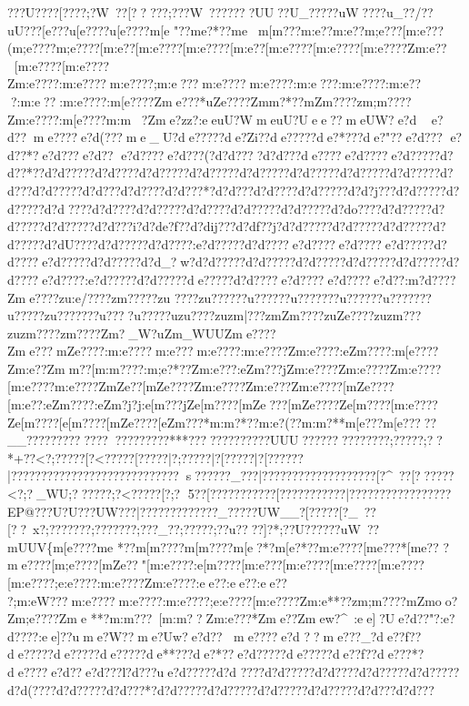 {{{{{{{{{{{{{{{{{{{{{{{{{{{{{{{{{{{{{{{{{{{{{{{{{{{{{{{{{{{{{{{{{{{{{{{{{{{{{{{{{{{{{{{{{{{{{{{{{{{{{{{{{{{{{{{{{{{{{{{{{{{{{{{{{{{{{{{{{{{{{{{{{{{{{{{{{{{{{{{{{{{{{{{{{{{{{{{{{{{{{{{{{{{{{{{{{{{{{{{{{{{{{{{{{{{{{{{{{{{{{{{{{{{{{{{{{{{{{{{{{{{{{{{{{{{{{{{{{{{{{{{{{{{{{{{{{{{{{{{{{{{{{{??{?U???{?[???{?;?W~??[?????;???W~???????UU??U_?????uW???}?u_??/??uU?? ?[e???u[e??? ?u[e????{m[e
"??{m{e?*??{m{e {m[m?? ?{m:e??{m:e??{m;e???[m:e???({m;e????{m;e????[m:e??[m:e????[m:e????[m:e??[m:e????[m:e????[m:e????Zm:e??[m:e????[m:e????Zm:e????:m:e????m:e????;m:e???m:e????m:e????:m:e???:m:e????:m:e???:m:e??:m:e????:m[e????Zme???*{uZe????Zm{m?*??{mZm????zm;m????Zm:e????:m[e????{m:m?Zme?zz?:eeuU?WmeuU?Uee?? meUW}?e?d  e?d?? me????e?d(???me_U?de?????de?Zi??de?????de?*???de?"??e?d???
e?d??*?e?d??? e?d??  e?d????e?d???(?d?d????d?d???de????e?d????e?d?????d?d??*??d?d?????d?d????d?d?????d?d?????d?d?????d?d?????d?d?????d?d?????d?d???d?d?????d?d???d?d????d?d???*?d?d???d?d????d?d?????d?d?j???d?d?????d?d?????d?d????d?d????d?d?????d?d????d?d?????d?d?????d?do????d?d?????d?d?????d?d?????d?d???i?d?de?f??d?dij???d?df??j?d?d?????d?d?????d?d?????d?d?????d?dU????d?d?????d?d????:e?d?????d?d????e?d????e?d????e?d?????d?d????e?d?????d?d?????d?d_?w?d?d?????d?d?????d?d?????d?d?????d?d?????d?d????e?d????:e?d?????d?d?????de?????d?d????e?d????e?d????e?d??:m?d????Zme????zu:e/????}zm?????}zu
????zu??????u??????u???????u?????}?u???????u?????zu???????u????u?}????{uzu????zuzm|???zmZm????zuZe????zuzm ???zuzm ????}zm????}Zm?_W?uZm_WUUZme????Zme???mZe????:m:e????m:e???m:e????:m:e????Zm:e????:eZm????:m[e????Zm:e??Zmm??[m:m????:m;e?*??Zm:e???:eZm???jZm:e????Zm:e????Zm:e????[m:e????{m:e????ZmZe??[mZe????Zm:e????Zm:e???Zm:e????[mZe????[m:e??:eZm????:eZm?j?j:e[m???jZe[m????[mZe???[mZe????Ze[m????[m:e????Ze[m????[e[m????[mZe????[eZm???*{m:m?*??{m:e?(??{m:m?* *{m[e???{m[e?????}__?????}??????}?? ??}???????}***?????????????UUU??}??????}??????;?????;??*+??<?;?????[?<?????\?[?????|?;?????|?[?????|?[?????{?|?????{???????{?????????{??????{?s{?{??   ??{?_???|?{?????{?{?????{?{?????{?[?^~??[??????<?;?_WU;??????;?<?????[?;?
5?{?[?????{?\?????{?[?????{?{?????|?{???????{?????{?{?    {?{?EP@ ??{?U?U??{?UW??{?|???{?????????{?_}????{?UW__{?[???? {?[?_~??[??~x?;???????;???????;???_?? ;??}??? ;??u?? ??]?* ;??}U??????uW~??}{mUUV\{m[e????{m{e
*??{m[m????{m[m????{m[e?*?{m[e?*??{m:e????[m{e???*[m{e??
?{me????[m;e????[mZe??"[m:e????:e[m????[m:e???[m:e????[m:e????[m:e????[m:e????;e:e????:m:e????Zm:e????:ee??  :ee??  :ee?? ?;m:eW???m:e????m:e????:m:e????;e:e????[m:e????Zm:e**??zm;m????{mZmoo?Zm;e????Zme
**?{m:m???~[m:m??Zm:e???*Zme??Zmew?^~:ee]?Ue?d??"?:e?d????:ee]??ume?W??me?Uw?e?d?? me????e?d
??me???_?de??f??de?????de?????de?????de**???de?*??e?d?????de?????de??f??de???*?de????e?d??e?d??  ?l?d???ue?d?????d?d ????d?d?????d?d????d?d?????d?d?????d?d(????d?d?????d?d???*?d?d?????d?d?????d?d?????d?d?????d?d???d?d???
}}}}}}}}}}}}}}}}}}}}}}}}}}}}}}}}}}}}}}}}}}}}}}}}}}}}}}}}}}}}}}}}}}}}}}}}}}}}}}}}}}}}}}}}}}}}}}}}}}}}}}}}}}}}}}}}}}}}}}}}}}}}}}}}}}}}}}}}}}}}}}}}}}}}}}}}}}}}}}}}}}}}}}}}}}}}}}}}}}}}}}}}}}}}}}}}}}}}}}}}}}}}}}}}}}}}}}}}}}}}}}}}}}}}}}}}}}}}}}}}}}}}}}}}}}}}}}}}}}}}}}}}}}}}}}}}}}}}}}}}}}}}}}}}}}}}}}}}}}}}}}}}}}}}}}}}}}}}}}}}}}}}}}}}}}}}}}}}}}
